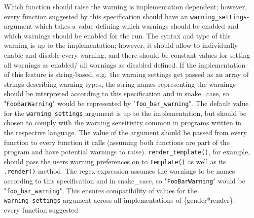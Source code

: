 \documentclass{article}
\begin{document}
    Which function should raise the warning is implementation dependent;
    however, every function suggested by this specification should have an \texttt{warning\_settings}-argument which takes a value defining which warnings should be enabled and which warnings should be enabled for the run.
    The syntax and type of this warning is up to the implementation;
    however, it should allow to individually enable and disable every warning, and there should be constant values for setting all warnings as enabled/ all warnings as disabled defined.
    If the implementation of this feature is string-based, e.g.\ the warning settings get passed as an array of strings describing warning types, the string names representing the warnings should be interpreted according to this specification and in snake\_case, so "\texttt{FooBarWarning}" would be represented by  "\texttt{foo\_bar\_warning}".
    The default value for the \texttt{warning\_settings} argument is up to the implementation, but should be chosen to comply with the warning sensitivity common in programs written in the respective language.
    The value of the argument should be passed from every function to every function it calls (assuming both functions are part of the program and have potential warnings to raise).
    \texttt{render\_template()}, for example, should pass the users warning preferences on to \texttt{Template()} as well as its \texttt{.render()} method.
    The regex-expression assumes the warnings to be names according to this specification and in snake\_case, so "\texttt{FooBarWarning}" would be "\texttt{foo\_bar\_warning}".
    This ensures compatibility of values for the \texttt{warning\_settings}-argument across all implementations of \{gender*render\}.\\
every function suggested
\end{document}
